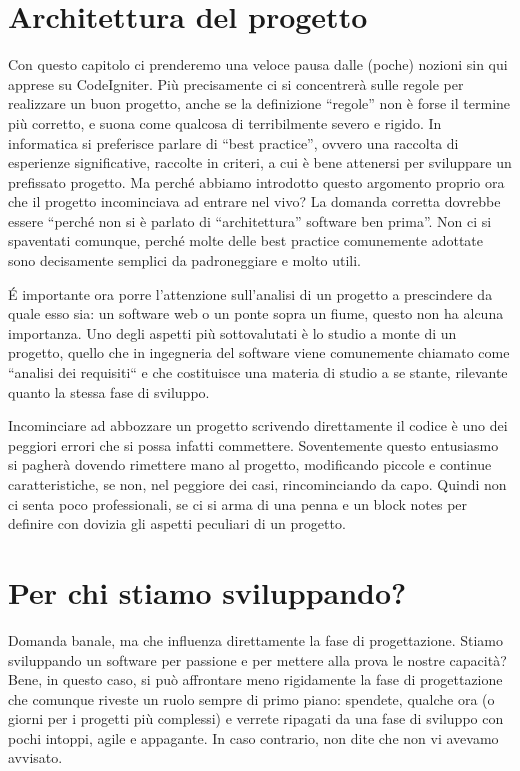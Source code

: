 \section{Architettura del progetto}
\label{cap:architettura}

Con questo capitolo ci prenderemo una veloce pausa dalle (poche) nozioni sin qui apprese su CodeIgniter. Più precisamente ci si concentrerà sulle regole per realizzare un buon progetto, anche se la definizione ``regole'' non è forse il termine più corretto, e suona come qualcosa di terribilmente severo e rigido. In informatica si preferisce parlare di ``best practice'', ovvero una raccolta di esperienze significative, raccolte in criteri, a cui è bene attenersi per sviluppare un prefissato progetto. Ma perché abbiamo introdotto questo argomento proprio ora che il progetto incominciava ad entrare nel vivo? La domanda corretta dovrebbe essere ``perché non si è parlato di ``architettura'' software ben prima''. Non ci si spaventati comunque, perché molte delle best practice comunemente adottate sono decisamente semplici da padroneggiare e molto utili.

\'E importante ora porre l'attenzione sull'analisi di un progetto a prescindere da quale esso sia: un software web o un ponte sopra un fiume, questo non ha alcuna importanza. Uno degli aspetti più sottovalutati è lo studio a monte di un progetto, quello che in ingegneria del software viene comunemente chiamato come ``analisi dei requisiti`` e che costituisce una materia di studio a se stante, rilevante quanto la stessa fase di sviluppo.

Incominciare ad abbozzare un progetto scrivendo direttamente il codice è uno dei peggiori errori che si possa infatti commettere. Soventemente questo entusiasmo si pagherà dovendo rimettere mano al progetto, modificando piccole e continue caratteristiche, se non, nel peggiore dei casi, rincominciando da capo. Quindi non ci senta poco professionali, se ci si arma di una penna e un block notes per definire con dovizia gli aspetti peculiari di un progetto.

\section*{Per chi stiamo sviluppando?}
Domanda banale, ma che influenza direttamente la fase di progettazione. Stiamo sviluppando un software per passione e per mettere alla prova le nostre capacità? Bene, in questo caso, si può affrontare meno rigidamente la fase di progettazione che comunque riveste un ruolo sempre di primo piano: spendete, qualche ora (o giorni per i progetti più complessi) e verrete ripagati da una fase di sviluppo con pochi intoppi, agile e appagante. In caso contrario, non dite che non vi avevamo avvisato.

